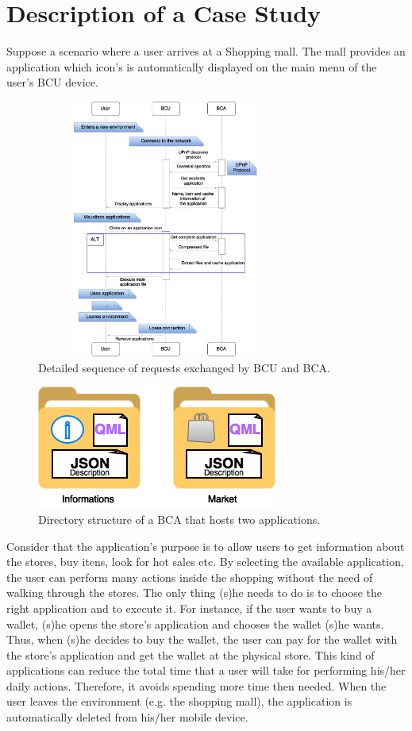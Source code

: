 \documentclass[journal]{IEEEtran}
\begin{document}
\section{Description of a Case Study}
Suppose a scenario where a user arrives at a Shopping mall. The mall provides an application which icon's is automatically displayed on the main menu of the user's BCU device.

\begin{figure}[!htb]
    \includegraphics[width = 8.5cm, height = 8.5cm]{FIG4}
    \caption{Detailed sequence of requests exchanged by BCU and BCA.}
\end{figure}

\begin{figure}[!htb]
    \includegraphics[scale = 0.83]{FIG3}
    \caption{Directory structure of a BCA that hosts two applications.}
\end{figure}

Consider that the application's purpose is to allow users to get information about the stores, buy itens, look for hot sales etc. By selecting the available application, the user can perform many actions inside the shopping without the need of walking through the stores. The only thing (s)he needs to do is to choose the right application and to execute it. For instance, if the user wants to buy a wallet, (s)he opens the store's  application and chooses the wallet (s)he wants. Thus, when (s)he decides to buy the wallet, the user can pay for the wallet with the store's application and get the wallet at the physical store. This kind of applications can reduce the total time that a user will take for performing his/her daily actions. Therefore, it avoids spending more time then needed. When the user leaves the environment (e.g. the shopping mall), the application is automatically deleted from his/her mobile device.
\end{document}
